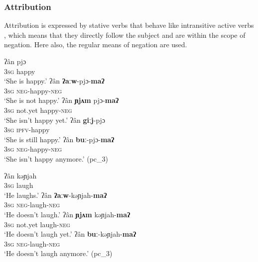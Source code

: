 \documentclass[output=paper,colorlinks,citecolor=brown]{langscibook}
\begin{document}
\subsubsection{Attribution} \label{sec:rum:2.3.3}

Attribution is expressed by stative verbs  that behave like intransitive active verbs , which means that they directly follow the subject and are within the scope of negation. Here also, the regular means of negation are used.

\ea\label{ex:rum:38}
    \ea\label{ex:rum:38a}
        \gll ʔân	pjɔ \\ 
             3\textsc{sg} happy \\
        \glt ‘She is happy.’
    \ex\label{ex:rum:38b}
        \gll ʔân	\textbf{ʔaːw}-pjɔ-\textbf{maʔ} \\
             3\textsc{sg} \textsc{neg}{}-happy-\textsc{neg} \\
        \glt  ‘She is not happy.’
    \ex\label{ex:rum:38c}
        \gll ʔân	\textbf{ɲjʌm}	pjɔ-\textbf{maʔ} \\
             3\textsc{sg} not.yet happy{}-\textsc{neg} \\
        \glt ‘She isn’t happy yet.’
    \ex\label{ex:rum:38d}
        \gll ʔân	\textbf{giːj}-pjɔ \\
             3\textsc{sg} \textsc{ipfv}{}-happy \\
        \glt ‘She is still happy.’
    \ex\label{ex:rum:38e}
        \gll ʔân	\textbf{buː}-pjɔ-\textbf{maʔ} \\
             3\textsc{sg} \textsc{neg}{}-happy-\textsc{neg} \\
        \glt ‘She isn’t happy anymore.’ (pc\_3)
    \z
\z 

\ea\label{ex:rum:39}
    \ea\label{ex:rum:39a}
        \gll ʔân	kəɲjah \\ 
              3\textsc{sg} laugh\\
        \glt ‘He laughs.’
    \ex\label{ex:rum:39b}
        \gll ʔân	\textbf{ʔaːw}-kəɲjah-\textbf{maʔ} \\
             3\textsc{sg} \textsc{neg}{}-laugh-\textsc{neg} \\
        \glt ‘He doesn’t laugh.’
    \ex\label{ex:rum:39c}
        \gll ʔân	\textbf{ɲjʌm}	kəɲjah-\textbf{maʔ} \\
             3\textsc{sg} not.yet laugh-\textsc{neg} \\
        \glt ‘He doesn’t laugh yet.’
    \ex\label{ex:rum:39d}
        \gll ʔân	\textbf{buː}-kəɲjah-\textbf{maʔ} \\
             3\textsc{sg} \textsc{neg}{}-laugh-\textsc{neg} \\
        \glt  ‘He doesn’t laugh anymore.’ (pc\_3)
    \z
\z 
\end{document}
